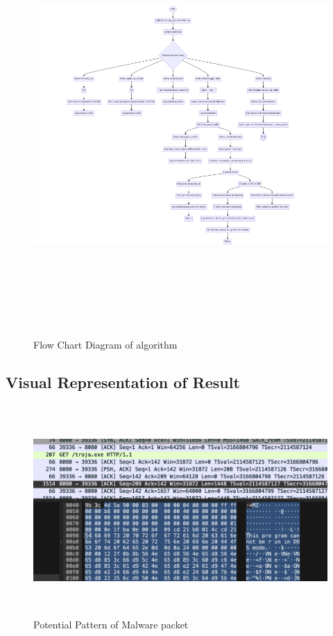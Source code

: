 \documentclass[12pt,letterpaper]{article}
\begin{document}
\begin{figure}[httb]
    \centering
    \includegraphics[width =\textwidth, height = 16cm]{images/mermaid-diagram-2024-05-21-182552.png}
    \caption{Flow Chart Diagram of algorithm}
    \label{fig:Flow Chart Diagram algorithm}
\end{figure}

\newpage
\subsection{Visual Representation of Result}
\begin{figure}[htbp]
    \centering
    \includegraphics[width=\textwidth, height=8cm]{images/Screenshot 2024-05-21 at 01.01.06.png}
    \caption{Potential Pattern of Malware packet}
    \label{fig:Potential Pattern of Malware packet}
\end{figure}
\end{document}
